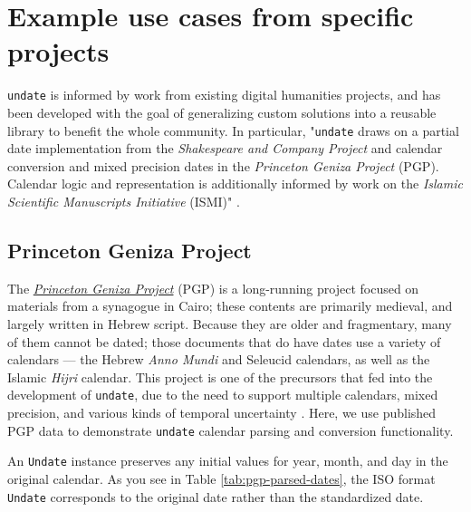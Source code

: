 \documentclass{anthology-ch}         %
\begin{document}
\section{Example use cases from specific projects}\label{example-use-cases-from-specific-projects}

\texttt{undate} is informed by work from existing digital humanities projects, and has been developed with the goal of generalizing custom solutions into a reusable library to benefit the whole community. In particular, "\texttt{undate} draws on a partial date implementation from the \textit{Shakespeare and Company Project} and calendar conversion and mixed
precision dates in the \textit{Princeton Geniza Project} (PGP). Calendar
logic and representation is additionally informed by work on
the \textit{Islamic Scientific Manuscripts Initiative} (ISMI)" \cite{koeser_princeton_2025}.

\subsection{Princeton Geniza Project}\label{princeton-geniza-project}

The \href{https://geniza.princeton.edu/}{\textit{Princeton Geniza Project}} (PGP) is
a long-running project focused on materials from a synagogue in Cairo; these contents are
primarily medieval, and largely written in Hebrew script. Because they are older and fragmentary, many of them cannot be dated;  those documents that do have dates use a variety of calendars — the Hebrew \textit{Anno Mundi} and Seleucid calendars, as well as the
Islamic \textit{Hijri} calendar.  This project is one of the precursors that fed into the development of \texttt{undate}, due to the need to support multiple calendars, mixed precision, and various kinds of temporal uncertainty \cite{rustow_dating_2020}. Here, we use published PGP data \cite{rustow_princeton_2025} to demonstrate \texttt{undate} calendar parsing and conversion functionality. 

An \texttt{Undate} instance preserves any initial values for year, month, and day in the original calendar. As you see in Table \ref{tab:pgp-parsed-dates}, the ISO format \texttt{Undate} corresponds to the original date rather than the standardized date.
\end{document}
